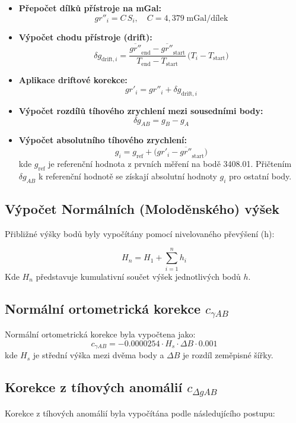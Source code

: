 \begin{itemize}
  \item \textbf{Přepočet dílků přístroje na mGal:}
    \[
      gr''_i = C\,S_i,
      \quad C = 4{,}379\;\text{mGal/dílek}
    \]
  \item \textbf{Výpočet chodu přístroje (drift):}
    \[
      \delta g_{\mathrm{drift},i}
        = \frac{\overline{gr''}_{\mathrm{end}} - \overline{gr''}_{\mathrm{start}}}
               {T_{\mathrm{end}} - T_{\mathrm{start}}}
          \,\bigl(T_i - T_{\mathrm{start}}\bigr)
    \]
  \item \textbf{Aplikace driftové korekce:}
    \[
      gr'_i = gr''_i + \delta g_{\mathrm{drift},i}
    \]
  \item \textbf{Výpočet rozdílů tíhového zrychlení mezi sousedními body:}
    \[
      \delta g_{AB} = g_B - g_A
    \]
  \item \textbf{Výpočet absolutního tíhového zrychlení:}
    \[
      g_i = g_{\mathrm{ref}}
          + \bigl(gr'_i - \overline{gr''}_{\mathrm{start}}\bigr)
    \]
    kde \(g_{\mathrm{ref}}\) je referenční hodnota z prvních měření na bodě 3408.01. Přičtením \(\delta g_{AB}\) k referenční hodnotě se získají absolutní hodnoty \(g_i\) pro ostatní body.
\end{itemize}


\subsection{Výpočet Normálních (Moloděnského) výšek}

Přibližné výšky bodů byly vypočítány pomocí nivelovaného převýšení (h):

\[
H_n = H_1+\sum_{i=1}^n h_i
\]
Kde \( H_n \) představuje kumulativní součet výšek jednotlivých bodů \( h \).
\subsection*{Normální ortometrická korekce \( c_{\gamma AB} \)}
Normální ortometrická korekce byla vypočtena jako: 
\[
c_{\gamma AB} = -0.0000254 \cdot H_s \cdot \Delta B \cdot 0.001
\]
kde \(H_s\) je střední výška mezi dvěma body a \(\Delta B\) je rozdíl zeměpisné šířky.
\subsection*{Korekce z tíhových anomálií \( c_{\Delta g AB} \)}
Korekce z tíhových anomálií byla vypočítána podle následujícího postupu:

